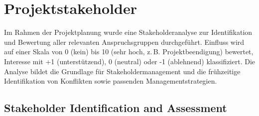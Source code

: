 
\chapter{Projektstakeholder}
\label{chap:stakeholder}

Im Rahmen der Projektplanung wurde eine Stakeholderanalyse zur Identifikation
und Bewertung aller relevanten Anspruchsgruppen durchgeführt. Einfluss wird auf
einer Skala von 0 (kein) bis 10 (sehr hoch, z.\,B. Projektbeendigung) bewertet,
Interesse mit +1 (unterstützend), 0 (neutral) oder -1 (ablehnend) klassifiziert.
Die Analyse bildet die Grundlage für Stakeholdermanagement und die frühzeitige
Identifikation von Konflikten sowie passenden Managementstrategien.

\section{Stakeholder Identification and Assessment}

